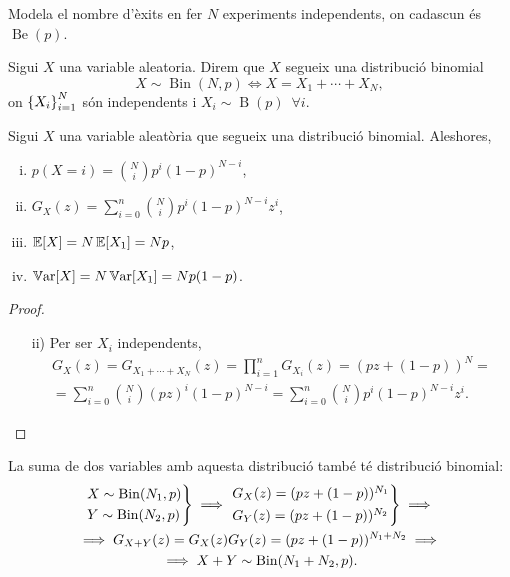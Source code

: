 Modela el nombre d'èxits en fer $N$ experiments independents, on cadascun és $\operatorname{Be}(p)$.

\begin{defi}
  Sigui $X$ una variable aleatoria. Direm que $X$ segueix una distribució binomial
    \[X \sim \operatorname{Bin}(N,p) \iff X = X_1 + \cdots + X_N,\]
    on $\left\{ X_i \right\}_{i=1}^{N}$ són independents i $X_i \sim \operatorname{B}(p) \enspace\forall i$.
\end{defi}

\begin{prop}
    Sigui $X$ una variable aleatòria que segueix una distribució binomial. Aleshores,
    \begin{enumerate}[i)]
        \item $p(X=i) = \binom{N}{i}p^i(1-p)^{N-i}$,
        \item $G_X(z) = \sum_{i=0}^{n} \binom{N}{i}p^i(1-p)^{N-i}z^i$,
        \item $\operatorname{\mathbb{E}}[X] = N\operatorname{\mathbb{E}}[X_1] = Np$,
        \item $\operatorname{\mathbb{V}ar}[X] = N\operatorname{\mathbb{V}ar}[X_1] = Np(1-p)$.
    \end{enumerate}
\end{prop}

\begin{proof} %
    \begin{enumerate}[i)]
        \item[]
        \item[ii)] Per ser $X_i$ independents,
        \begin{gather*}
        G_X(z) = G_{X_1 + \cdots + X_N}(z) = \prod_{i=1}^{n}G_{X_i}(z) = (pz+(1-p))^N = \\
        = \sum_{i=0}^n \binom{N}{i}(pz)^i(1-p)^{N-i} = \sum_{i=0}^{n} \binom{N}{i}p^i(1-p)^{N-i}z^i.
        \end{gather*}
    \end{enumerate}
\end{proof}

\begin{obs} La suma de dos variables amb aquesta distribució també té distribució binomial:
    \begin{gather*}
    \begin{rcases*} X \sim \operatorname{Bin}(N_1,p) \\ Y \sim \operatorname{Bin}(N_2,p) \end{rcases*} \implies
    \begin{rcases*} G_X(z) = (pz+(1-p))^{N_1} \\ G_Y(z) = (pz+(1-p))^{N_2} \end{rcases*}
    \implies \\
    \implies G_{X+Y}(z) = G_X(z)G_Y(z) = (pz+(1-p))^{N_1+N_2} \implies \\
    \implies X+Y \sim \operatorname{Bin}(N_1+N_2,p).
    \end{gather*}
\end{obs}

